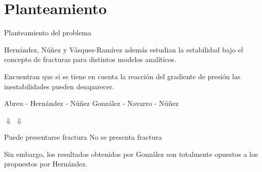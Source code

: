\documentclass[handout,t]{beamer}
\begin{document}
\section{Planteamiento}
\begin{frame}{Planteamiento del problema}

\vspace{-4mm}

\justifying Hernández, Núñez y Vásques-Ramírez además estudian la estabilidad bajo el concepto de fracturas para distintos modelos analíticos.

\vspace{2mm}


Encuentran que si se tiene en cuenta la reacción del gradiente de presión las inestabilidades pueden desaparecer.

\vspace{7mm}

Abreu - Hernández - Núñez \hspace{20mm} González - Navarro - Núñez

\vspace{2mm}

\hspace{18mm}$\Downarrow$ \hspace{64mm}$\Downarrow$

\vspace{2mm}

Puede presentarse fractura \hspace{22mm} No se presenta fractura

\vspace{7mm}

Sin embargo, los resultados obtenidos por González son totalmente opuestos a los propuestos por Hernández.


\end{frame}
\end{document}
